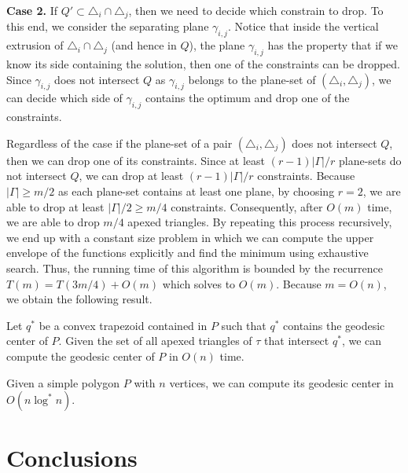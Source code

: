 \documentclass[a4paper,UKenglish]{lipics}
\begin{document}
\textbf{Case 2.} If $Q'\subset \triangle_i\cap \triangle_j$, then we need to decide which constrain to drop. 
To this end, we consider the separating plane $\gamma_{i,j}$. Notice that inside the vertical extrusion of $\triangle_i\cap \triangle_j$ (and hence in $Q$), the plane $\gamma_{i,j}$ has the property that if we know its side containing the solution, then one of the constraints can be dropped. Since $\gamma_{i,j}$ does not intersect $Q$ as $\gamma_{i,j}$ belongs to the plane-set of $(\triangle_i, \triangle_j)$, we can decide which side of $\gamma_{i,j}$ contains the optimum and drop one of the constraints.
\vspace{.05in}

Regardless of the case if the plane-set of a pair $(\triangle_i, \triangle_j)$ does not intersect $Q$, then we can drop one of its constraints. Since at least $(r-1)|\Gamma|/r$ plane-sets do not intersect $Q$, we can drop at least $(r-1)|\Gamma|/r$ constraints.
Because $|\Gamma| \geq m/2$ as each plane-set contains at least one plane, by choosing $r = 2$, we are able to drop at least $|\Gamma|/2 \geq m/4$ constraints.
Consequently, after $O(m)$ time, we are able to drop $m/4$ apexed triangles.
By repeating this process recursively, we end up with a constant size problem in which we can compute the upper envelope of the functions explicitly and find the minimum using exhaustive search. 
Thus, the running time of this algorithm is bounded by the recurrence $T(m) = T(3m/4) + O(m)$ which solves to $O(m)$. 
Because $m = O(n)$, we obtain the following result.

\begin{theorem}
Let $q^*$ be a convex trapezoid contained in $P$ such that $q^*$ contains the geodesic center of $P$. Given the set of all apexed triangles of $\tau$ that intersect $q^*$, we can compute the geodesic center of $P$ in $O(n)$ time.
\end{theorem}

\begin{corollary}
Given a simple polygon $P$ with $n$ vertices, we can compute its geodesic center in $O(n \log ^* n)$.
\end{corollary}

\section{Conclusions}



\end{document}
